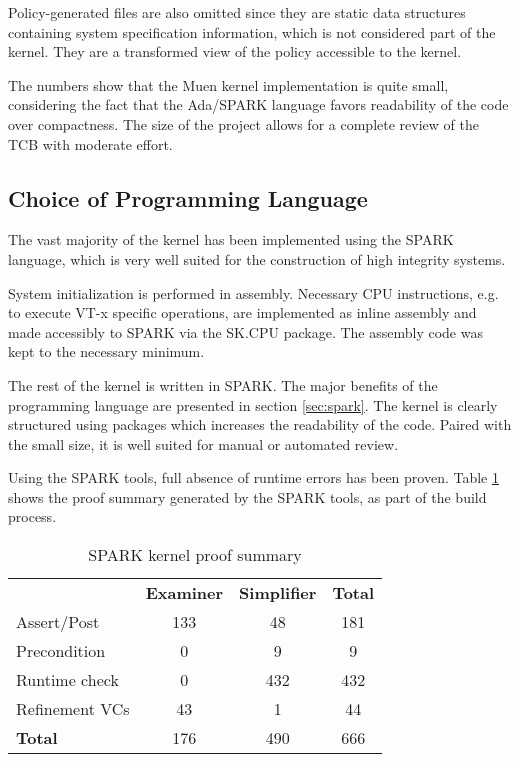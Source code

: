 Policy-generated files are also omitted since they are static data structures
containing system specification information, which is not considered part of the
kernel. They are a transformed view of the policy accessible to the kernel.

The numbers show that the Muen kernel implementation is quite small, considering
the fact that the Ada/SPARK language favors readability of the code over
compactness. The size of the project allows for a complete review of the TCB
with moderate effort.

\subsection{Choice of Programming Language}
The vast majority of the kernel has been implemented using the SPARK language,
which is very well suited for the construction of high integrity systems.

System initialization is performed in assembly. Necessary CPU instructions,
e.g. to execute VT-x specific operations, are implemented as inline assembly
and made accessibly to SPARK via the SK.CPU package. The assembly code was
kept to the necessary minimum.

The rest of the kernel is written in SPARK. The major benefits of the
programming language are presented in section \ref{sec:spark}. The kernel is
clearly structured using packages which increases the readability of the code.
Paired with the small size, it is well suited for manual or automated review.

Using the SPARK tools, full absence of runtime errors has been proven. Table
\ref{tab:kernel-proof-sum} shows the proof summary generated by the SPARK tools,
as part of the build process.

\begin{table}[h]
	\centering
	\begin{tabular}{l c c c}
		& \textbf{Examiner} & \textbf{Simplifier} & \textbf{Total} \\
		Assert/Post    & 133 & 48  & 181 \\
		Precondition   & 0   & 9   & 9   \\
		Runtime check  & 0   & 432 & 432 \\
		Refinement VCs & 43  & 1   & 44 \\
		\hline
		\textbf{Total} & 176 & 490 & 666 \\
	\end{tabular}
	\caption{SPARK kernel proof summary}
	\label{tab:kernel-proof-sum}
\end{table}

